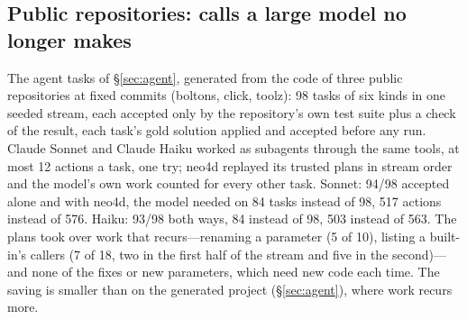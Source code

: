 \documentclass[10pt]{article}
\begin{document}
\subsection{Public repositories: calls a large model no longer makes}
\label{sec:public}
The agent tasks of \S\ref{sec:agent}, generated from the code of three public repositories at fixed commits (boltons,
click, toolz): 98 tasks of six kinds in one seeded stream, each accepted only by the repository's own test suite plus
a check of the result, each task's gold solution applied and accepted before any run. Claude Sonnet and Claude Haiku
worked as subagents through the same tools, at most 12 actions a task, one try; neo4d replayed its trusted plans in
stream order and the model's own work counted for every other task. Sonnet: 94/98 accepted alone and with neo4d, the
model needed on 84 tasks instead of 98, 517 actions instead of 576. Haiku: 93/98 both ways, 84 instead of 98, 503
instead of 563. The plans took over work that recurs---renaming a parameter (5 of 10), listing a built-in's callers
(7 of 18, two in the first half of the stream and five in the second)---and none of the fixes or new parameters,
which need new code each time. The saving is smaller than on the generated project (\S\ref{sec:agent}), where work
recurs more.
\end{document}
